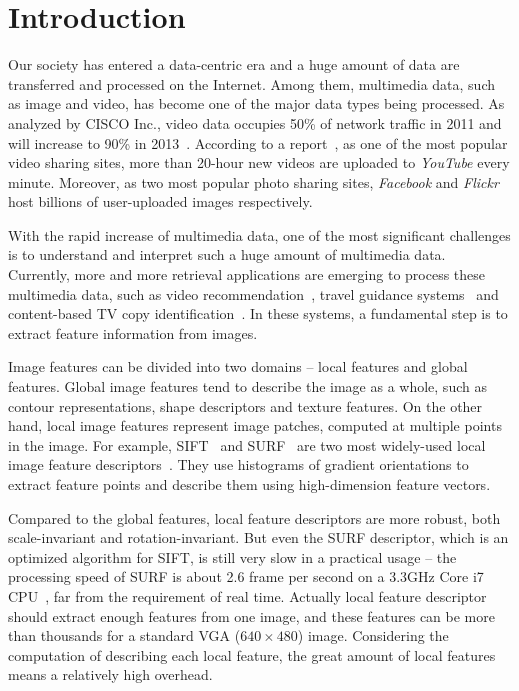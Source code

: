 \section{Introduction}
\label{sec:introduction}

Our society has entered a data-centric era and a huge amount of data are transferred and processed on the Internet. Among them, multimedia data, such as image and video, has become one of the major data types being processed. As analyzed by CISCO Inc., video data occupies 50\% of network traffic in 2011 and will increase to 90\% in 2013~\cite{CISCO2011}.  According to a report~\cite{youtube2009}, as one of the most popular video sharing sites, more than 20-hour new videos are uploaded to \emph{YouTube} every minute. Moreover, as two most popular photo sharing sites, \emph{Facebook} and \emph{Flickr} host billions of user-uploaded images respectively.

With the rapid increase of multimedia data, one of the most significant challenges is to understand and interpret such a huge amount of multimedia data. Currently, more and more retrieval applications are emerging to process these multimedia data, such as video recommendation~\cite{videorecommendation2007}, travel guidance systems~\cite{travelguidance2010} and content-based TV copy identification~\cite{tvidentify2003}. In these systems, a fundamental step is to extract feature information from images. 

Image features can be divided into two domains -- local features and global features. Global image features tend to describe the image as a whole, such as contour representations, shape descriptors and texture features. On the other hand, local image features represent image patches, computed at multiple points in the image. For example, SIFT~\cite{Lowe2004SIFT} and SURF~\cite{Bay2006SURF} are two most widely-used local image feature descriptors~\cite{Mikolajczyk2005Evaluation}\cite{Bauer2007Evaluation}. They use histograms of gradient orientations to extract feature points and describe them using high-dimension feature vectors.

Compared to the global features, local feature descriptors are more robust, both scale-invariant and rotation-invariant. But even the SURF descriptor, which is an optimized algorithm for SIFT, is still very slow in a practical usage -- the processing speed of SURF is about 2.6 frame per second on a 3.3GHz Core i7 CPU~\cite{Fang2011ispass}, far from the requirement of real time. Actually local feature descriptor should extract enough features from one image, and these features can be more than thousands for a standard VGA ($640\times480$) image. Considering the computation of describing each local feature, the great amount of local features means a relatively high overhead.

